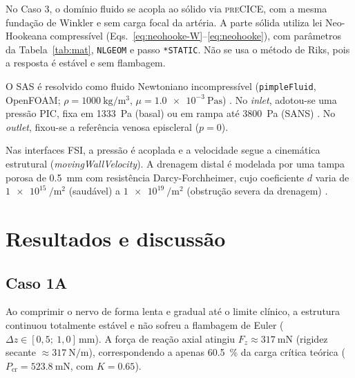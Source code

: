 \documentclass[article, hidelinks,oneside,12pt]{abntex2}
\begin{document}
No Caso 3, o domínio fluido se acopla ao sólido via \textsc{preCICE}, com a mesma fundação de Winkler e sem carga focal da artéria. A parte sólida utiliza lei Neo-Hookeana compressível (Eqs.~\ref{eq:neohooke-W}--\ref{eq:neohooke}), com parâmetros da Tabela~\ref{tab:mat}, \texttt{NLGEOM} e passo \texttt{*STATIC}. Não se usa o método de Riks, pois a resposta é estável e sem flambagem.

O SAS é resolvido como fluido Newtoniano incompressível (\texttt{pimpleFluid}, OpenFOAM; $\rho = \SI{1000}{\kilogram\per\meter\cubed}$, $\mu = \SI{1.0e-3}{\pascal\second}$) \cite{gholampour2018, namaghi2026}. No \textit{inlet}, adotou-se uma pressão PIC, fixa em \SI{1333}{\pascal} (basal) ou em rampa até \SI{3800}{\pascal} (SANS) \cite{feola2016, wang2016, namaghi2026}. No \textit{outlet}, fixou-se a referência venosa episcleral ($p=0$). 

Nas interfaces FSI, a pressão é acoplada e a velocidade segue a cinemática estrutural (\textit{movingWallVelocity}). A drenagem distal é modelada por uma tampa porosa de \SI{0.5}{\milli\meter} com resistência Darcy-Forchheimer, cujo coeficiente $d$ varia de $\SI{1e15}{\per\meter\squared}$ (saudável) a $\SI{1e19}{\per\meter\squared}$ (obstrução severa da drenagem) \cite{namaghi2026}. 



\section*{Resultados e discussão}
\label{sec:resultados}

\subsection*{Caso 1A}
\label{sec:res-caso1A}

Ao comprimir o nervo de forma lenta e gradual até o limite clínico, a estrutura continuou totalmente estável e não sofreu a flambagem de Euler ($\Delta z \in [0{,}5;\ 1{,}0]\,\si{\milli\meter}$). A força de reação axial atingiu $F_z \approx \SI{317}{\milli\newton}$ (rigidez secante $\approx \SI{317}{\newton\per\meter}$), correspondendo a apenas \SI{60.5}{\%} da carga crítica teórica ($P_{\mathrm{cr}} = \SI{523.8}{\milli\newton}$, com $K = 0.65$).
\end{document}
